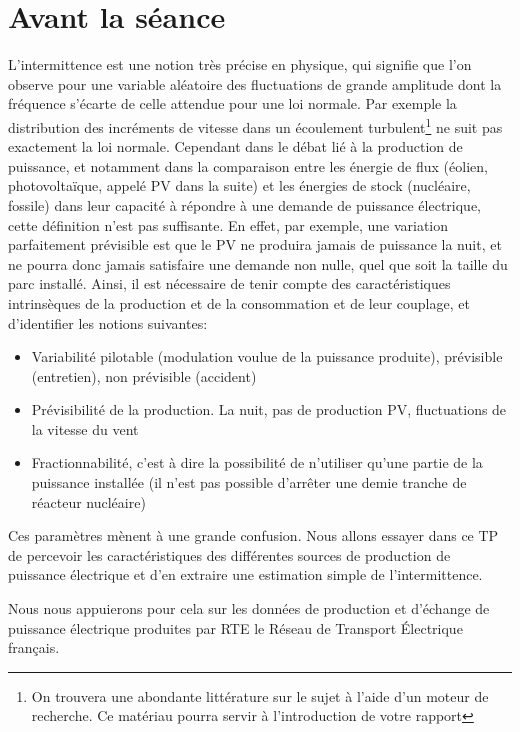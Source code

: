 \documentclass[12pt,a4,french]{article}
\begin{document}
\part{Avant la séance}
\label{sec:avant}
L'intermittence est une notion très précise en physique, qui signifie que
l'on observe pour une variable aléatoire des fluctuations de grande amplitude dont la fréquence s'écarte de celle attendue pour une loi normale. Par exemple la distribution des incréments de vitesse dans un écoulement turbulent\footnote{On trouvera une abondante littérature sur le sujet à l'aide d'un moteur de recherche. Ce matériau pourra servir à l'introduction de votre rapport} ne suit pas exactement la loi normale.
Cependant dans le débat lié à
la production de puissance, et notamment dans la comparaison entre les
énergie de flux (éolien, photovoltaïque, appelé PV dans la suite) et les énergies de stock (nucléaire,
fossile) dans leur capacité à répondre à une demande de puissance
électrique, cette définition n'est pas suffisante. En effet, par exemple,
une variation parfaitement prévisible est que le PV ne produira jamais de
puissance la nuit, et ne pourra donc jamais satisfaire une demande non nulle, quel que
soit la taille du parc installé. Ainsi, il est nécessaire de tenir compte
des caractéristiques intrinsèques de la production et de la consommation et
de leur couplage, et d'identifier les notions suivantes:
\begin{itemize}
  \item Variabilité pilotable (modulation voulue de la puissance produite), prévisible (entretien), non prévisible (accident)
  
  \item Prévisibilité de la production. La nuit, pas de production PV, fluctuations de la vitesse du vent
  
  \item Fractionnabilité, c'est à dire la possibilité de n'utiliser qu'une
  partie de la puissance installée (il n'est pas possible d'arrêter une demie tranche de réacteur nucléaire)  
\end{itemize}
Ces paramètres mènent à une grande confusion. Nous allons essayer dans ce
TP de percevoir les caractéristiques des différentes sources de production
de puissance électrique et d'en extraire une estimation simple de
l'intermittence.

Nous nous appuierons pour cela sur les données de production et d'échange de puissance électrique produites par RTE le Réseau de Transport Électrique français.
\end{document}

